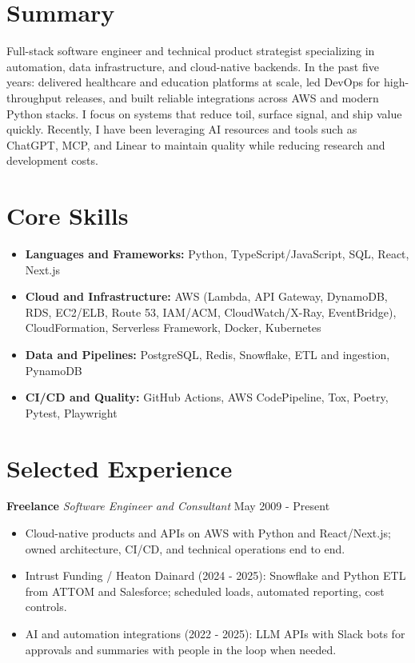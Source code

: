 \documentclass[10pt]{article}
\begin{document}
\section*{Summary}
Full-stack software engineer and technical product strategist specializing in automation, data infrastructure, and cloud-native backends. In the past five years: delivered healthcare and education platforms at scale, led DevOps for high-throughput releases, and built reliable integrations across AWS and modern Python stacks. I focus on systems that reduce toil, surface signal, and ship value quickly. Recently, I have been leveraging AI resources and tools such as ChatGPT, MCP, and Linear to maintain quality while reducing research and development costs.

\section*{Core Skills}
\begin{itemize}[leftmargin=*]
  \item \textbf{Languages and Frameworks:} Python, TypeScript/JavaScript, SQL, React, Next.js
  \item \textbf{Cloud and Infrastructure:} AWS (Lambda, API Gateway, DynamoDB, RDS, EC2/ELB, Route 53, IAM/ACM, CloudWatch/X-Ray, EventBridge), CloudFormation, Serverless Framework, Docker, Kubernetes
  \item \textbf{Data and Pipelines:} PostgreSQL, Redis, Snowflake, ETL and ingestion, PynamoDB
  \item \textbf{CI/CD and Quality:} GitHub Actions, AWS CodePipeline, Tox, Poetry, Pytest, Playwright
\end{itemize}

\section*{Selected Experience}
\noindent\textbf{Freelance} \textit{Software Engineer and Consultant} \hfill May 2009 - Present\par
\begin{itemize}
  \item Cloud-native products and APIs on AWS with Python and React/Next.js; owned architecture, CI/CD, and technical operations end to end.
  \item Intrust Funding / Heaton Dainard (2024 - 2025): Snowflake and Python ETL from ATTOM and Salesforce; scheduled loads, automated reporting, cost controls.
  \item AI and automation integrations (2022 - 2025): LLM APIs with Slack bots for approvals and summaries with people in the loop when needed.
\end{itemize}
\end{document}
